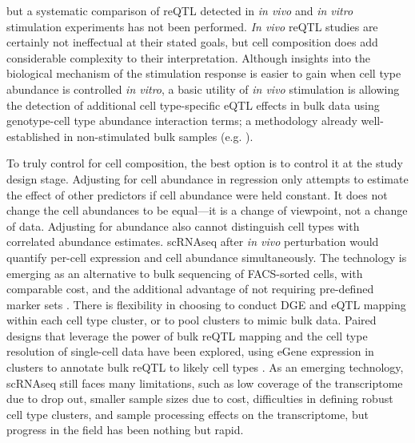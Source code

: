 but a systematic comparison of \gls{reQTL} detected in \textit{in vivo} and \textit{in vitro} stimulation experiments has not been performed.
\textit{In vivo} \gls{reQTL} studies are certainly not ineffectual at their stated goals, 
but cell composition does add considerable complexity to their interpretation.
Although insights into the biological mechanism of the stimulation response is easier to gain when cell type abundance is controlled \textit{in vitro},
a basic utility of \textit{in vivo} stimulation is allowing the detection of additional cell type-specific \gls{eQTL} effects in bulk data using genotype-cell type abundance interaction terms;
a methodology already well-established in non-stimulated bulk samples (e.g. \autocite{westra2015CellSpecificEQTL}).

To truly control for cell composition, the best option is to control it at the study design stage.
Adjusting for cell abundance in regression only attempts to estimate the effect of other predictors if cell abundance were held constant.
It does not change the cell abundances to be equal---it is a change of viewpoint, not a change of data.
Adjusting for abundance also cannot distinguish cell types with correlated abundance estimates.
\Gls{scRNAseq} after \textit{in vivo} perturbation would quantify per-cell expression and cell abundance simultaneously.
The technology is emerging as an alternative to bulk sequencing of \gls{FACS}-sorted cells, with comparable cost,
and the additional advantage of not requiring pre-defined marker sets \autocite{vanderwijst2020SinglecellEQTLGenConsortium}.
There is flexibility in choosing to conduct \gls{DGE} and \gls{eQTL} mapping within each cell type cluster, or to pool clusters to mimic bulk data.
Paired designs that leverage the power of bulk \gls{reQTL} mapping and the cell type resolution of single-cell data have been explored,
using eGene expression in clusters to annotate bulk \gls{reQTL} to likely cell types \autocite{devries2020IntegratingGWASBulk}.
As an emerging technology, \gls{scRNAseq} still faces many limitations, such as
    low coverage of the transcriptome due to drop out, 
    smaller sample sizes due to cost,
    difficulties in defining robust cell type clusters,
    and sample processing effects on the transcriptome,
but progress in the field has been nothing but rapid.


